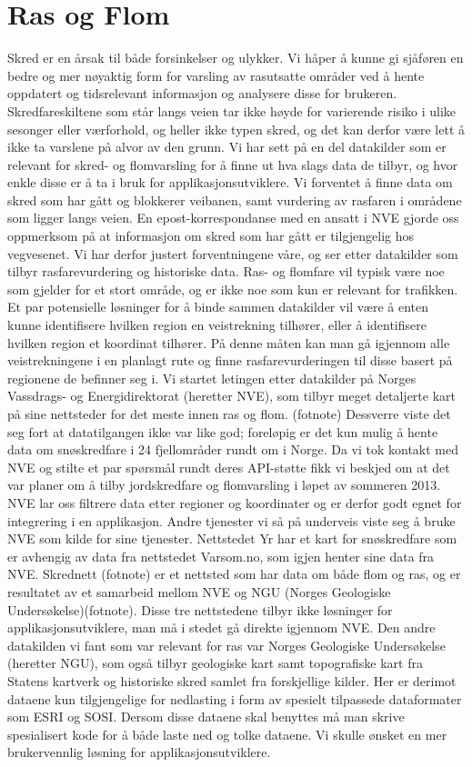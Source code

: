 \documentclass[a4paper,norsk,oneside]{book}
\begin{document}
\section{Ras og Flom}
 Skred er en årsak til både forsinkelser og ulykker. Vi håper å kunne gi sjåføren en bedre og mer nøyaktig form for varsling av rasutsatte områder ved å hente oppdatert og tidsrelevant informasjon og analysere disse for brukeren. Skredfareskiltene som står langs veien tar ikke høyde for varierende risiko i ulike sesonger eller værforhold, og heller ikke typen skred, og det kan derfor være lett å ikke ta varslene på alvor av den grunn.
    Vi har sett på en del datakilder som er relevant for skred- og flomvarsling for å finne ut hva slags data de tilbyr, og hvor enkle disse er å ta i bruk for applikasjonsutviklere. Vi forventet å finne data om skred som har gått og blokkerer veibanen, samt vurdering av rasfaren i områdene som ligger langs veien. En epost-korrespondanse med en ansatt i NVE gjorde oss oppmerksom på at informasjon om skred som har gått er tilgjengelig hos vegvesenet. Vi har derfor justert forventningene våre, og ser etter datakilder som tilbyr rasfarevurdering og historiske data.
    Ras- og flomfare vil typisk være noe som gjelder for et stort område, og er ikke noe som kun er relevant for trafikken. Et par potensielle løsninger for å binde sammen datakilder vil være å enten kunne identifisere hvilken region en veistrekning tilhører, eller å identifisere hvilken region et koordinat tilhører. På denne måten kan man gå igjennom alle veistrekningene i en planlagt rute og finne rasfarevurderingen til disse basert på regionene de befinner seg i.
	Vi startet letingen etter datakilder på Norges Vassdrags- og Energidirektorat (heretter NVE), som tilbyr meget detaljerte kart på sine nettsteder for det meste innen ras og flom. (fotnote) Dessverre viste det seg fort at datatilgangen ikke var like god; foreløpig er det kun mulig å hente data om snøskredfare i 24 fjellområder rundt om i Norge. Da vi tok kontakt med NVE og stilte et par spørsmål rundt deres API-støtte fikk vi beskjed om at det var planer om å tilby jordskredfare og flomvarsling i løpet av sommeren 2013. NVE lar oss filtrere data etter regioner og koordinater og er derfor godt egnet for integrering i en applikasjon.
	Andre tjenester vi så på underveis viste seg å bruke NVE som kilde for sine tjenester. Nettstedet Yr har et kart for snøskredfare som er avhengig av data fra nettstedet Varsom.no, som igjen henter sine data fra NVE. Skrednett (fotnote) er et nettsted som har data om både flom og ras, og er resultatet av et samarbeid mellom NVE og NGU (Norges Geologiske Undersøkelse)(fotnote). Disse tre nettstedene tilbyr ikke løsninger for applikasjonsutviklere, man må i stedet gå direkte igjennom NVE.
	Den andre datakilden vi fant som var relevant for ras var Norges Geologiske Undersøkelse (heretter NGU), som også tilbyr geologiske kart samt topografiske kart fra Statens kartverk og historiske skred samlet fra forskjellige kilder. Her er derimot dataene kun tilgjengelige for nedlasting i form av spesielt tilpassede dataformater som ESRI og SOSI.  Dersom disse dataene skal benyttes må man skrive spesialisert kode for å både laste ned og tolke dataene. Vi skulle ønsket en mer brukervennlig løsning for applikasjonsutviklere.
\end{document}
